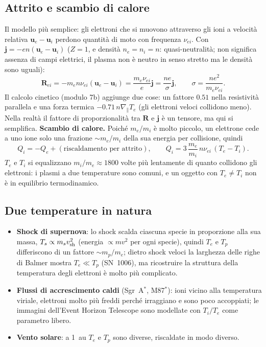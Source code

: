 \subsection{Attrito e scambio di calore}
Il modello più semplice: gli elettroni che si muovono attraverso gli ioni a velocità relativa $\mathbf{u}_e-\mathbf{u}_i$ perdono quantità di moto con frequenza $\nu_{ei}$. Con $\mathbf{j}=-en(\mathbf{u}_e-\mathbf{u}_i)$ ($Z=1$, e densità $n_e=n_i=n$: quasi-neutralità; non significa assenza di campi elettrici, il plasma non è neutro in senso stretto ma le densità sono uguali):
\begin{equation}
\mathbf{R}_{ei}=-m_en\nu_{ei}(\mathbf{u}_e-\mathbf{u}_i)=\frac{m_e\nu_{ei}}{e}\mathbf{j}=\frac{ne}{\sigma}\mathbf{j},\qquad\sigma=\frac{ne^2}{m_e\nu_{ei}} .
\end{equation}
Il calcolo cinetico (modulo 7b) aggiunge due cose: un fattore $0.51$ nella resistività parallela e una forza termica $-0.71\,n\nabla_\parallel T_e$ (gli elettroni veloci collidono meno). Nella realtà il fattore di proporzionalità tra $\mathbf{R}$ e $\mathbf{j}$ è un tensore, ma qui si semplifica.
\textbf{Scambio di calore.} Poiché $m_e/m_i$ è molto piccolo, un elettrone cede a uno ione solo una frazione $\sim m_e/m_i$ della sua energia per collisione, quindi
\begin{equation}
Q_i=-Q_e+(\text{riscaldamento per attrito}),\qquad Q_i=3\,\frac{m_e}{m_i}\,n\nu_{ei}\,(T_e-T_i).
\end{equation}
$T_e$ e $T_i$ si equalizzano $m_i/m_e\approx1800$ volte più lentamente di quanto collidono gli elettroni: i plasmi a due temperature sono comuni, e un oggetto con $T_e\neq T_i$ non è in equilibrio termodinamico.

\subsection{Due temperature in natura}
\begin{itemize}
\item \textbf{Shock di supernova}: lo shock scalda ciascuna specie in proporzione alla sua massa, $T_s\propto m_sv_{\rm sh}^2$ (energia $\propto mv^2$ per ogni specie), quindi $T_e$ e $T_p$ differiscono di un fattore $\sim m_p/m_e$; dietro shock veloci la larghezza delle righe di Balmer mostra $T_e\ll T_p$ (SN~1006), ma ricostruire la struttura della temperatura degli elettroni è molto più complicato.
\item \textbf{Flussi di accrescimento caldi} (Sgr~A$^*$, M87$^*$): ioni vicino alla temperatura viriale, elettroni molto più freddi perché irraggiano e sono poco accoppiati; le immagini dell'Event Horizon Telescope sono modellate con $T_i/T_e$ come parametro libero.
\item \textbf{Vento solare}: a 1~au $T_e$ e $T_p$ sono diverse, riscaldate in modo diverso.
\end{itemize}

